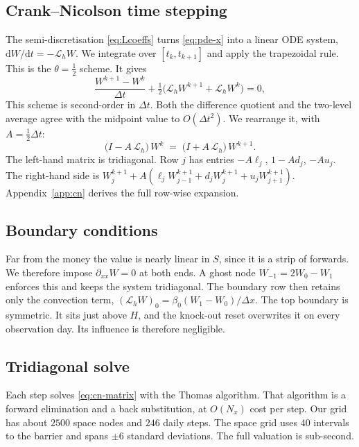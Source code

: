 \documentclass[11pt]{article}
\newcommand{\dd}{\mathrm{d}}
\newcommand{\Lh}{\mathcal{L}_h}
\begin{document}
\subsection{Crank--Nicolson time stepping}
The semi-discretisation \eqref{eq:Lcoeffs} turns \eqref{eq:pde-x} into a linear ODE system,
$\dd W/\dd t=-\Lh W$. We integrate over $[t_k,t_{k+1}]$ and apply the trapezoidal rule. This is the
$\theta=\tfrac12$ scheme. It gives
\begin{equation}
  \frac{W^{k+1}-W^{k}}{\Delta t} + \tfrac12\bigl(\Lh W^{k+1}+\Lh W^{k}\bigr) = 0,
  \label{eq:cn}
\end{equation}
This scheme is second-order in $\Delta t$. Both the difference quotient and the two-level average
agree with the midpoint value to $O(\Delta t^2)$. We rearrange it, with $A=\tfrac12\Delta t$:
\begin{equation}
  \boxed{\;\bigl(I-A\,\Lh\bigr)\,W^{k} \;=\; \bigl(I+A\,\Lh\bigr)\,W^{k+1}.\;}
  \label{eq:cn-matrix}
\end{equation}
The left-hand matrix is tridiagonal. Row $j$ has entries $-A\ell_j$, $1-Ad_j$, $-Au_j$. The
right-hand side is $W_j^{k+1}+A(\ell_j W_{j-1}^{k+1}+d_j W_j^{k+1}+u_j W_{j+1}^{k+1})$.
Appendix~\ref{app:cn} derives the full row-wise expansion.

\subsection{Boundary conditions}
Far from the money the value is nearly linear in $S$, since it is a strip of forwards. We therefore
impose $\partial_{xx}W=0$ at both ends. A ghost node $W_{-1}=2W_0-W_1$ enforces this and keeps the
system tridiagonal. The boundary row then retains only the convection term,
$(\Lh W)_0=\beta_0 (W_1-W_0)/\Delta x$. The top boundary is symmetric. It sits just above $H$, and
the knock-out reset overwrites it on every observation day. Its influence is therefore negligible.

\subsection{Tridiagonal solve}
Each step solves \eqref{eq:cn-matrix} with the Thomas algorithm. That algorithm is a forward
elimination and a back substitution, at $O(N_x)$ cost per step. Our grid has about $2500$ space
nodes and $246$ daily steps. The space grid uses 40 intervals to the barrier and spans $\pm6$
standard deviations. The full valuation is sub-second.
\end{document}
